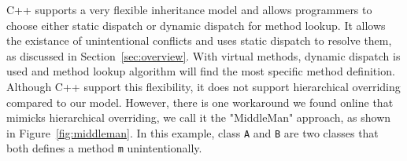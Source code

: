 \begin{comment} %
\noindent {\bf C++ model.}
C++ supports a very flexible inheritance model and allows programmers to choose either static dispatch or dynamic dispatch for method lookup.
It allows unintentional conflicts and uses static dispatch to resolve them, as discussed in Section~\ref{sec:overview}. For example, given the following code
\begin{lstlisting}[language=Java]
class A { public: void m() {cout << "MA" << endl;} };
class B { public: void m() {cout << "MB" << endl;} };
class C : public A, public B { 
	void m() {cout << "MC" << endl;}
};
void func(A* a) { a->m(); }
int main() {
	C* c = new C();
	c->B::m();
	func(c); 
	return 0; //Running result: MB MA
}
\end{lstlisting}
The running result is $MB \; MA$, meaning that it uses static dispatch (looks at the static types) for method \lstinline|m()|. 
On calling \texttt{func(c)}, in spite that the dynamic type of \texttt{c} is class \texttt{C}, the method call still dispatches to 
\lstinline|A.m|.
However, we can alter the code a little bit with \textbf{\texttt{virtual}} methods and the result will be totally different:
\begin{lstlisting}[language=c++]
class A { public: virtual void m() {cout << "MA" << endl;} };
class B { public: virtual void m() {cout << "MB" << endl;} };
class C : public A, public B { 
    public: virtual void m() {cout << "MC" << endl;}
};
void func(A* a) { a->m(); }
int main() {
	C* c = new C();
	c->B::m();
	func(c); 
	return 0; //Running result: MB MC
}
\end{lstlisting}
Now the running result will be $MB \; MC$. With virtual methods, dynamic dispatch is used and 
method lookup algorithm will find the most specific method definition of $m$, namely \lstinline|C.m| at this time.
Although C++ support this flexibility, dynamic dispatching on
unintentional conflicting methods is problematic, as discussed in Section~\ref{sec:overview}.\bruno{why? give example of
  something that goes wrong?}
Furthermore, C++ does not support hierarchical overriding compared to our
model.
\end{comment}



C++ supports a very flexible inheritance model and allows programmers to choose either static dispatch or dynamic dispatch for method lookup.
It allows the existance of unintentional conflicts and uses static dispatch to resolve them, as discussed in Section~\ref{sec:overview}. 
With virtual methods, dynamic dispatch is used and 
method lookup algorithm will find the most specific method definition.
Although C++ support this flexibility, it does not support hierarchical overriding compared to our
model. However, there is one workaround we found online that mimicks hierarchical overriding, we call it the "MiddleMan" approach, as shown in Figure~\ref{fig:middleman}. In this example, class \texttt{A} and \texttt{B} are two classes that both defines a method \texttt{m} unintentionally. 

